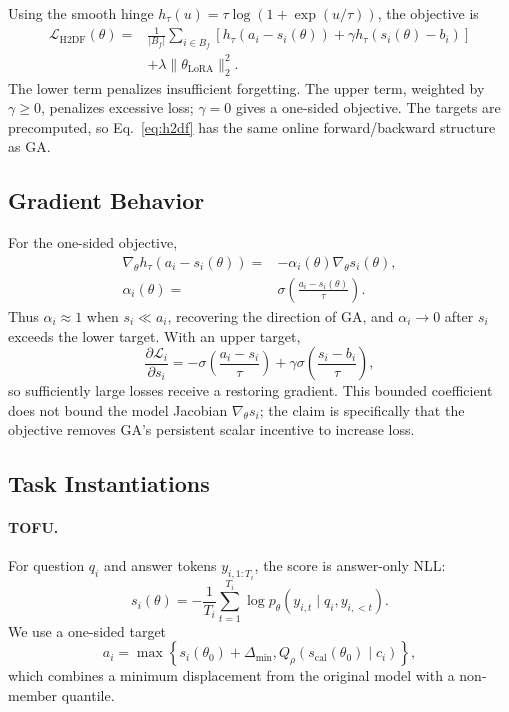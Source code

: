 \documentclass[10pt,twocolumn]{article}
\newcommand{\Lcal}{\mathcal{L}}
\begin{document}
Using the smooth hinge $h_\tau(u)=\tau\log(1+\exp(u/\tau))$, the objective is
\begin{equation}
\begin{aligned}
  \Lcal_{\mathrm{H2DF}}(\theta)
  ={}&\frac{1}{|B_f|}\sum_{i\in B_f}
  \left[h_\tau(a_i-s_i(\theta))
  +\gamma h_\tau(s_i(\theta)-b_i)\right]\\
  &+\lambda\|\theta_{\mathrm{LoRA}}\|_2^2 .
\end{aligned}
\label{eq:h2df}
\end{equation}
The lower term penalizes insufficient forgetting. The upper term, weighted by
$\gamma\geq0$, penalizes excessive loss; $\gamma=0$ gives a one-sided objective.
The targets are precomputed, so Eq.~\eqref{eq:h2df} has the same online
forward/backward structure as GA.

\subsection{Gradient Behavior}

For the one-sided objective,
\begin{equation}
\begin{aligned}
  \nabla_\theta h_\tau(a_i-s_i(\theta))
  ={}& -\alpha_i(\theta)\nabla_\theta s_i(\theta), \\
  \alpha_i(\theta)
  ={}& \sigma\!\left(
    \frac{a_i-s_i(\theta)}{\tau}
  \right).
\end{aligned}
\label{eq:gradient}
\end{equation}
Thus $\alpha_i\approx1$ when $s_i\ll a_i$, recovering the direction of GA, and
$\alpha_i\to0$ after $s_i$ exceeds the lower target. With an upper target,
\begin{equation}
  \frac{\partial\Lcal_i}{\partial s_i}
  =-\sigma\!\left(\frac{a_i-s_i}{\tau}\right)
  +\gamma\sigma\!\left(\frac{s_i-b_i}{\tau}\right),
\end{equation}
so sufficiently large losses receive a restoring gradient. This bounded
coefficient does not bound the model Jacobian $\nabla_\theta s_i$; the claim is
specifically that the objective removes GA's persistent scalar incentive to
increase loss.

\subsection{Task Instantiations}

\paragraph{TOFU.}
For question $q_i$ and answer tokens $y_{i,1:T_i}$, the score is answer-only NLL:
\begin{equation}
  s_i(\theta)=-\frac{1}{T_i}\sum_{t=1}^{T_i}
  \log p_\theta(y_{i,t}\mid q_i,y_{i,<t}).
\end{equation}
We use a one-sided target
\begin{equation}
  a_i=\max\!\left\{
  s_i(\theta_0)+\Delta_{\min},
  Q_\rho(s_{\mathrm{cal}}(\theta_0)\mid c_i)
  \right\},
  \label{eq:tofu-target}
\end{equation}
which combines a minimum displacement from the original model with a non-member
quantile.
\end{document}
